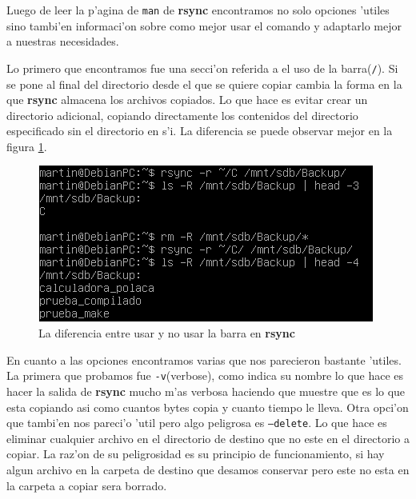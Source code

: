 \documentclass[11pt]{article}
\newcommand{\rsync}[0]{\textbf{rsync}}
\begin{document}
		Luego de leer la p'agina de \texttt{man} de \rsync{} encontramos no solo opciones 'utiles sino tambi'en informaci'on sobre como mejor usar el comando y adaptarlo mejor a nuestras necesidades.

		Lo primero que encontramos fue una secci'on referida a el uso de la barra(\texttt{/}). Si se pone al final del directorio desde el que se quiere copiar cambia la forma en la que \rsync{} almacena los archivos copiados. Lo que hace es evitar crear un directorio adicional, copiando directamente los contenidos del directorio especificado sin el directorio en s'i. La diferencia se puede observar mejor en la figura \ref{fig:rsync_backup_forwardslash}.

		\begin{figure}[H]
    			\centering
    			\includegraphics[scale=0.80]{Images/rsync/rsync_backup_forwardslash.PNG}
    			\caption{La diferencia entre usar y no usar la barra en \rsync{}}
    			\label{fig:rsync_backup_forwardslash}
		\end{figure}

		En cuanto a las opciones encontramos varias que nos parecieron bastante 'utiles. La primera que probamos fue \texttt{-v}(verbose), como indica su nombre lo que hace es hacer la salida de \rsync{} mucho m'as verbosa haciendo que muestre que es lo que esta copiando asi como cuantos bytes copia y cuanto tiempo le lleva. Otra opci'on que tambi'en nos pareci'o 'util pero algo peligrosa es \texttt{--delete}. Lo que hace es eliminar cualquier archivo en el directorio de destino que no este en el directorio a copiar. La raz'on de su peligrosidad es su principio de funcionamiento, si hay algun archivo en la carpeta de destino que desamos conservar pero este no esta en la carpeta a copiar sera borrado.
\end{document}
